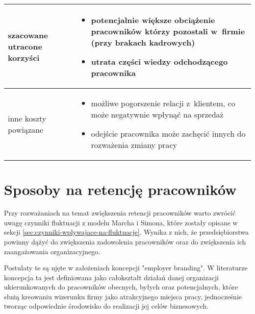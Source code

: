 \begin{minipage}{\textwidth}
\begin{table}[H]
\begin{center}
\begin{tabular}{|P{.15\textwidth}|P{.75\textwidth}|}
                         szacowane utracone korzyści &
                         \begin{itemize}
                             \item potencjalnie większe obciążenie pracowników którzy pozostali w~firmie (przy brakach kadrowych)
                             \item utrata części wiedzy odchodzącego pracownika
                         \end{itemize} \\
                         \hline

                         inne koszty powiązane &
                         \begin{itemize}
                             \item możliwe pogorszenie relacji z~klientem, co może negatywnie wpłynąć na sprzedaż
                             \item odejście pracownika może zachęcić innych do rozważenia zmiany pracy
                         \end{itemize} \\
                         \hline
                     \end{tabular}
                 \end{center}
                 \raggedright{}
                 \vspace{0.75cm}
             \end{table}
\end{minipage}


\section{Sposoby na retencję pracowników}\label{sec:retencja}

Przy rozważaniach na temat zwiększenia retencji pracowników warto zwrócić uwagę czynniki fluktuacji z modelu Marcha i Simona,
które zostały opisane w sekcji \ref{sec:czynniki-wplywajace-na-fluktuacje}.
Wynika z nich, że przedsiębiorstwa powinny dążyć do zwiększenia zadowolenia pracowników oraz do zwiększenia ich zaangażowania organizacyjnego.

Postulaty te są ujęte w założeniach koncepcji "employer branding".
W literaturze koncepcja ta jest definiowana jako
całokształt działań danej organizacji ukierunkowanych do pracowników obecnych, byłych oraz potencjalnych,
które służą kreowaniu wizerunku firmy jako atrakcyjnego miejsca pracy,
jednocześnie tworząc odpowiednie środowisko do realizacji jej celów biznesowych.


